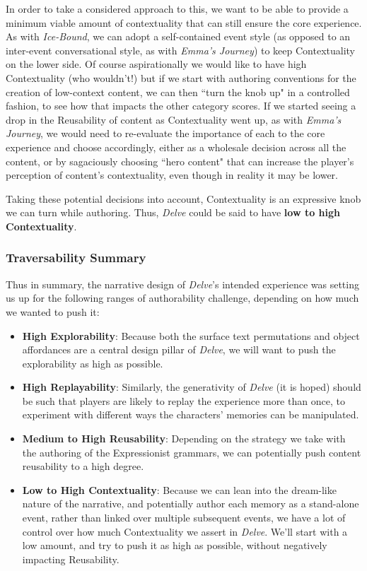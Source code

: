 In order to take a considered approach to this, we want to be able to provide a minimum viable amount of contextuality that can still ensure the core experience. As with \textit{Ice-Bound}, we can adopt a self-contained event style (as opposed to an inter-event conversational style, as with \textit{Emma's Journey}) to keep Contextuality on the lower side. Of course aspirationally we would like to have high Contextuality (who wouldn't!) but if we start with authoring conventions for the creation of low-context content, we can then ``turn the knob up" in a controlled fashion, to see how that impacts the other category scores. If we started seeing a drop in the Reusability of content as Contextuality went up, as with \textit{Emma's Journey}, we would need to re-evaluate the importance of each to the core experience and choose accordingly, either as a wholesale decision across all the content, or by sagaciously choosing ``hero content" that can increase the player's perception of content's contextuality, even though in reality it may be lower.

Taking these potential decisions into account, Contextuality is an expressive knob we can turn while authoring. Thus, \textit{Delve} could be said to have \textbf{low to high Contextuality}.

\subsubsection{Traversability Summary}\label{subsubsec:delve-traversability-summary}

Thus in summary, the narrative design of \textit{Delve}'s intended experience was setting us up for the following ranges of authorability challenge, depending on how much we wanted to push it:

\begin{itemize}
    \item \textbf{High Explorability}: Because both the surface text permutations and object affordances are a central design pillar of \textit{Delve}, we will want to push the explorability as high as possible.
    \item \textbf{High Replayability}: Similarly, the generativity of \textit{Delve} (it is hoped) should be such that players are likely to replay the experience more than once, to experiment with different ways the characters' memories can be manipulated.
    \item \textbf{Medium to High Reusability}: Depending on the strategy we take with the authoring of the Expressionist grammars, we can potentially push content reusability to a high degree.
    \item \textbf{Low to High Contextuality}: Because we can lean into the dream-like nature of the narrative, and potentially author each memory as a stand-alone event, rather than linked over multiple subsequent events, we have a lot of control over how much Contextuality we assert in \textit{Delve}. We'll start with a low amount, and try to push it as high as possible, without negatively impacting Reusability.
\end{itemize}

